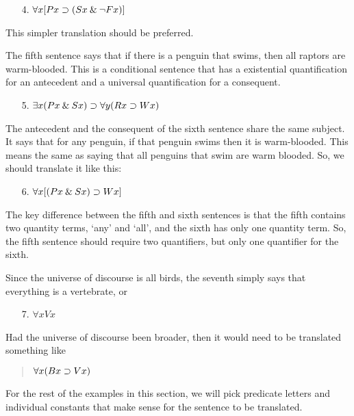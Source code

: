 \documentclass[../logic-text.tex]{subfiles}
\begin{document}
\begin{enumerate}
  \item[4.] \(\forall x[Px \supset (Sx \mathbin{\&} \neg Fx)]\)
\end{enumerate}

\noindent This simpler translation should be preferred.

The fifth sentence says that if there is a penguin that swims, then all raptors are warm-blooded. This is a conditional sentence that has a existential quantification for an antecedent and a universal quantification for a consequent.

\begin{enumerate}
  \item [5.] \(\exists x(Px \mathbin{\&} Sx) \supset \forall y(Rx \supset Wx)\)
\end{enumerate}

The antecedent and the consequent of the sixth sentence share the same subject. It says that for any penguin, if that penguin swims then it is warm-blooded. This means the same as saying that all penguins that swim are warm blooded. So, we should translate it like this:

\begin{enumerate}
  \item [6.] \(\forall x [(Px \mathbin{\&} Sx) \supset Wx]\)
\end{enumerate}

\noindent The key difference between the fifth and sixth sentences is that the fifth contains two quantity terms, \enquote*{any} and \enquote*{all}, and the sixth has only one quantity term.
So, the fifth sentence should require two quantifiers, but only one quantifier for the sixth.

Since the universe of discourse is all birds, the seventh simply says that everything is a vertebrate, or

\begin{enumerate}
  \item [7.] \(\forall xVx\)
\end{enumerate}

\noindent Had the universe of discourse been broader, then it would need to be translated something like

\begin{quote}
  \(\forall x(Bx \supset Vx)\)
\end{quote}

\noindent For the rest of the examples in this section, we will pick predicate letters and individual constants that make sense for the sentence to be translated.
\end{document}
